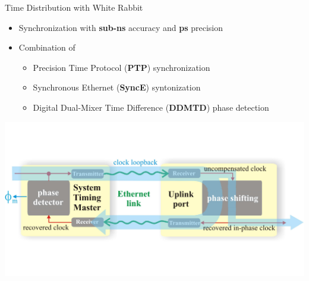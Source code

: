 \documentclass[compress,red]{beamer}
\begin{document}
\begin{frame}{Time Distribution with White Rabbit}

\begin{center}
  \begin{itemize}
    \item Synchronization with {\bf sub-ns} accuracy and {\bf ps} precision
    \item Combination of
	\begin{itemize}\small
	  \item Precision Time Protocol ({\bf PTP}) synchronization
	  \item Synchronous Ethernet ({\bf SyncE}) syntonization
	  \item Digital Dual-Mixer Time Difference ({\bf DDMTD}) phase detection
	\end{itemize}
  \end{itemize}
	\includegraphics[width=.9\textwidth]{misc/phase_tracking_v2_simple.pdf}
\end{center}  
\end{frame}
\end{document}

